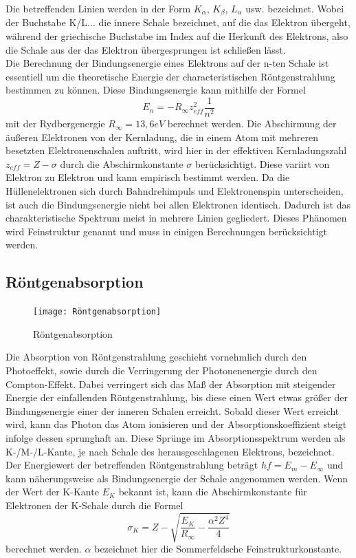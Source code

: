 Die betreffenden Linien werden in der Form $K_\alpha$, $K_\beta$, $L_\alpha$ usw. bezeichnet. Wobei der Buchstabe K/L... die innere Schale bezeichnet, auf die das Elektron übergeht, während der griechische Buchstabe im Index auf die Herkunft des Elektrons, also die Schale aus der das Elektron übergesprungen ist schließen lässt. \\
Die Berechnung der Bindungsenergie eines Elektrons auf der n-ten Schale ist essentiell um die theoretische Energie der characteristischen Röntgenstrahlung bestimmen zu können. Diese Bindungsenergie kann mithilfe der Formel
\begin{equation}
E_n=-R_{\infty}z_{eff}^2\frac{1}{n^2}
\end{equation}
mit der Rydbergenergie $R_{\infty}=13,6 eV$ berechnet werden. Die Abschirmung der äußeren Elektronen von der Kernladung, die in einem Atom mit mehreren besetzten Elektronenschalen auftritt, wird hier in der effektiven Kernladungszahl $z_{eff}=Z-\sigma$ durch die Abschirmkonstante $\sigma$ berücksichtigt. Diese variirt von Elektron zu Elektron und kann empirisch bestimmt werden.
Da die Hüllenelektronen sich durch Bahndrehimpuls und Elektronenspin unterscheiden, ist auch die Bindungsenergie nicht bei allen Elektronen identisch. Dadurch ist das charakteristische Spektrum meist in mehrere Linien gegliedert. Dieses Phänomen wird Feinstruktur genannt und muss in einigen Berechnungen berücksichtigt werden.
\subsection{Röntgenabsorption}
\begin{figure}[h]
    \centering
    \texttt{[image: Röntgenabsorption]}
    \caption{Röntgenabsorption}
\end{figure}
Die Absorption von Röntgenstrahlung geschieht vornehmlich durch den Photoeffekt, sowie durch die Verringerung der Photonenenergie durch den Compton-Effekt. Dabei verringert sich das Maß der Absorption mit steigender Energie der einfallenden Röntgenstrahlung, bis diese einen Wert etwas größer der Bindungsenergie einer der inneren Schalen erreicht. Sobald dieser Wert erreicht wird, kann das Photon das Atom ionisieren und der Absorptionskoeffizient steigt infolge dessen sprunghaft an.
Diese Sprünge im Absorptionsspektrum werden als K-/M-/L-Kante, je nach Schale des herausgeschlagenen Elektrons, bezeichnet. Der Energiewert der betreffenden Röntgenstrahlung beträgt $hf=E_m-E_{\infty}$ und kann näherungsweise als Bindungsenergie der Schale angenommen werden. 
Wenn der Wert der K-Kante $E_K$ bekannt ist, kann die Abschirmkonstante für Elektronen der K-Schale durch die Formel
\begin{equation}
\sigma_K=Z-\sqrt{\frac{E_K}{R_{\infty}}-\frac{\alpha^2Z^4}{4}}
\end{equation}
berechnet werden. $\alpha$ bezeichnet hier die Sommerfeldsche Feinstrukturkonstante. 
